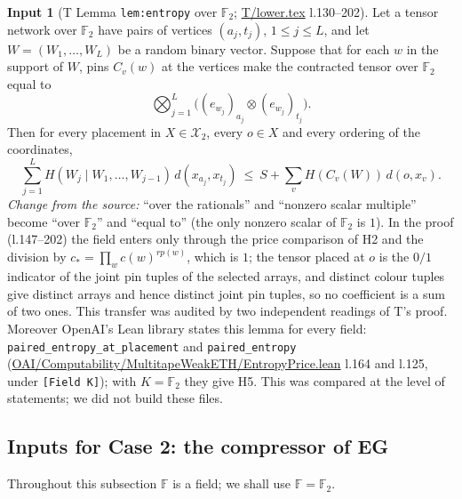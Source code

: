 \documentclass[11pt]{article}
\theoremstyle{definition}
\newtheorem{hyp}{Input}
\theoremstyle{remark}
\newcommand{\F}{\mathbb F}
\newcommand{\X}{\mathcal X}
\newcommand{\src}[1]{\url{#1}}
\begin{document}
\begin{hyp}[T Lemma \texttt{lem:entropy} over $\F_2$; \src{T/lower.tex} l.130--202]\label{H5}
Let a tensor network over $\F_2$ have pairs of vertices $(a_j,t_j)$, $1\le j\le L$, and let $W=(W_1,\dots,W_L)$ be a random
binary vector. Suppose that for each $w$ in the support of $W$, pins $C_v(w)$ at the vertices make the contracted tensor over
$\F_2$ equal to
\[
 \bigotimes_{j=1}^L\bigl((e_{w_j})_{a_j}\otimes(e_{w_j})_{t_j}\bigr).
\]
Then for every placement in $X\in\X_2$, every $o\in X$ and every ordering of the coordinates,
\begin{equation}\label{eq:entropy}
 \sum_{j=1}^{L}H(W_j\mid W_1,\dots,W_{j-1})\,d(x_{a_j},x_{t_j})\ \le\ S+\sum_vH(C_v(W))\,d(o,x_v).
\end{equation}
\emph{Change from the source:} ``over the rationals'' and ``nonzero scalar multiple'' become ``over $\F_2$'' and ``equal to''
(the only nonzero scalar of $\F_2$ is $1$). In the proof (l.147--202) the field enters only through the price comparison of H2
and the division by $c_*=\prod_wc(w)^{rp(w)}$, which is $1$; the tensor placed at $o$ is the $0/1$ indicator of the joint pin
tuples of the selected arrays, and distinct colour tuples give distinct arrays and hence distinct joint pin tuples, so no
coefficient is a sum of two ones. This transfer was audited by two independent readings of T's proof. Moreover OpenAI's Lean library states this lemma for every field: \texttt{paired\_entropy\_at\_placement} and
\texttt{paired\_entropy} (\src{OAI/Computability/MultitapeWeakETH/EntropyPrice.lean} l.164 and l.125, under \texttt{[Field K]}); with
$K=\F_2$ they give H5. This was compared at the level of statements; we did not build these files.
\end{hyp}

\subsection{Inputs for Case 2: the compressor of EG}

Throughout this subsection $\F$ is a field; we shall use $\F=\F_2$.
\end{document}
